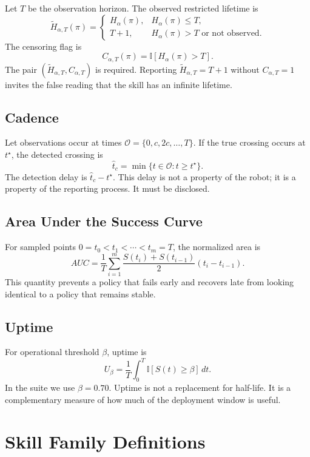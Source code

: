 \documentclass{article}
\newcommand{\life}[1]{H_{#1}}
\begin{document}
Let $T$ be the observation horizon. The observed restricted lifetime is
\[
\tilde{H}_{\alpha,T}(\pi) =
\begin{cases}
\life{\alpha}(\pi), & \life{\alpha}(\pi) \leq T,\\
T+1, & \life{\alpha}(\pi) > T \text{ or not observed.}
\end{cases}
\]
The censoring flag is
\[
C_{\alpha,T}(\pi)=\mathbb{I}[\life{\alpha}(\pi)>T].
\]
The pair $(\tilde{H}_{\alpha,T}, C_{\alpha,T})$ is required. Reporting
$\tilde{H}_{\alpha,T}=T+1$ without $C_{\alpha,T}=1$ invites the false reading
that the skill has an infinite lifetime.

\subsection{Cadence}

Let observations occur at times $\mathcal{O}=\{0,c,2c,\ldots,T\}$. If the true
crossing occurs at $t^\star$, the detected crossing is
\[
\hat{t}_c = \min \{ t \in \mathcal{O}: t \geq t^\star \}.
\]
The detection delay is $\hat{t}_c-t^\star$. This delay is not a property of the
robot; it is a property of the reporting process. It must be disclosed.

\subsection{Area Under the Success Curve}

For sampled points $0=t_0<t_1<\cdots<t_m=T$, the normalized area is
\[
AUC = \frac{1}{T}\sum_{i=1}^{m}
\frac{S(t_i)+S(t_{i-1})}{2}(t_i-t_{i-1}).
\]
This quantity prevents a policy that fails early and recovers late from looking
identical to a policy that remains stable.

\subsection{Uptime}

For operational threshold $\beta$, uptime is
\[
U_\beta = \frac{1}{T}\int_0^T \mathbb{I}[S(t)\geq \beta]\,dt.
\]
In the suite we use $\beta=0.70$. Uptime is not a replacement for half-life.
It is a complementary measure of how much of the deployment window is useful.

\section{Skill Family Definitions}
\end{document}
